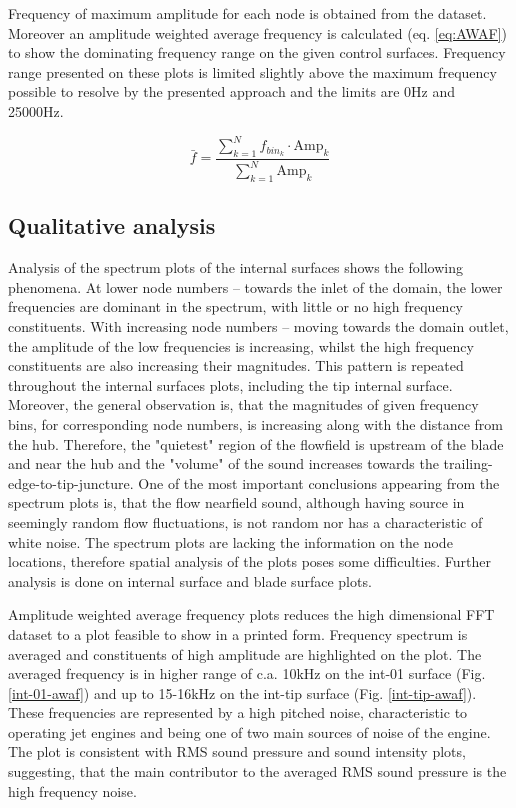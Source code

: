 Frequency of maximum amplitude for each node is obtained from the dataset. Moreover an amplitude weighted average frequency is calculated (eq. \ref{eq:AWAF}) to show the dominating frequency range on the given control surfaces. Frequency range presented on these plots is limited slightly above the maximum frequency possible to resolve by the presented approach and the limits are 0Hz and 25000Hz.

\begin{equation} \label{eq:AWAF}
\bar{f} = \frac{\sum_{k=1}^{N} f_{bin_k} \cdot \text{Amp}_k}{\sum_{k=1}^{N} \text{Amp}_{k}}
\end{equation}


\subsection{Qualitative analysis} \label{fft_res_qual}
Analysis of the spectrum plots of the internal surfaces shows the following phenomena. At lower node numbers -- towards the inlet of the domain, the lower frequencies are dominant in the spectrum, with little or no high frequency constituents. With increasing node numbers -- moving towards the domain outlet, the amplitude of the low frequencies is increasing, whilst the high frequency constituents are also increasing their magnitudes. This pattern is repeated throughout the internal surfaces plots, including the tip internal surface. Moreover, the general observation is, that the magnitudes of given frequency bins, for corresponding node numbers, is increasing along with the distance from the hub. Therefore, the "quietest" region of the flowfield is upstream of the blade and near the hub and the "volume" of the sound increases towards the trailing-edge-to-tip-juncture. One of the most important conclusions appearing from the spectrum plots is, that the flow nearfield sound, although having source in seemingly random flow fluctuations, is not random nor has a characteristic of white noise. The spectrum plots are lacking the information on the node locations, therefore spatial analysis of the plots poses some difficulties. Further analysis is done on internal surface and blade surface plots.

Amplitude weighted average frequency plots reduces the high dimensional FFT dataset to a plot feasible to show in a printed form. Frequency spectrum is averaged and constituents of high amplitude are highlighted on the plot. The averaged frequency is in higher range of c.a. 10kHz on the int-01 surface (Fig. \ref{int-01-awaf}) and up to 15-16kHz on the int-tip surface (Fig. \ref{int-tip-awaf}). These frequencies are represented by a high pitched noise, characteristic to operating jet engines and being one of two main sources of noise of the engine. The plot is consistent with RMS sound pressure and sound intensity plots, suggesting, that the main contributor to the averaged RMS sound pressure is the high frequency noise.

